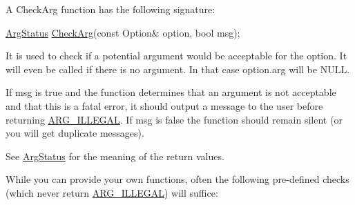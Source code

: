 A Check\-Arg function has the following signature\-: 
\begin{DoxyCode}
\hyperlink{namespace_option_parser_ad237d47d58c66dea8dcf4f53ac11a6e4}{ArgStatus} \hyperlink{namespace_option_parser_aee9955553cc70fd9fd41849622680c6a}{CheckArg}(\textcolor{keyword}{const} Option& option, \textcolor{keywordtype}{bool} msg); 
\end{DoxyCode}


It is used to check if a potential argument would be acceptable for the option. It will even be called if there is no argument. In that case {\ttfamily option.\-arg} will be {\ttfamily N\-U\-L\-L}.

If {\ttfamily msg} is {\ttfamily true} and the function determines that an argument is not acceptable and that this is a fatal error, it should output a message to the user before returning \hyperlink{namespace_option_parser_ad237d47d58c66dea8dcf4f53ac11a6e4a6ea016ff6334ed0d2ec885e96a76c472}{A\-R\-G\-\_\-\-I\-L\-L\-E\-G\-A\-L}. If {\ttfamily msg} is {\ttfamily false} the function should remain silent (or you will get duplicate messages).

See \hyperlink{namespace_option_parser_ad237d47d58c66dea8dcf4f53ac11a6e4}{Arg\-Status} for the meaning of the return values.

While you can provide your own functions, often the following pre-\/defined checks (which never return \hyperlink{namespace_option_parser_ad237d47d58c66dea8dcf4f53ac11a6e4a6ea016ff6334ed0d2ec885e96a76c472}{A\-R\-G\-\_\-\-I\-L\-L\-E\-G\-A\-L}) will suffice\-:


